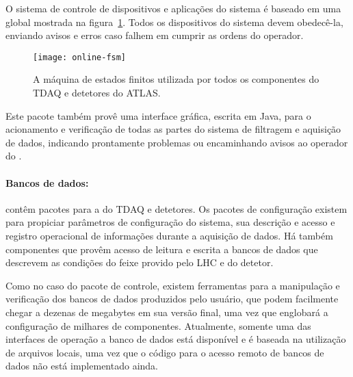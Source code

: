 O sistema de controle de dispositivos e aplicações do sistema  é
baseado em uma  global mostrada na
figura~\ref{fig:online-fsm}. Todos os dispositivos do sistema devem
obedecê-la, enviando avisos e erros caso falhem em cumprir as ordens do
operador.

\begin{figure}
\begin{center}
\texttt{[image: online-fsm]}
\end{center}
\caption{A máquina de estados finitos utilizada por todos os componentes do
TDAQ e detetores do ATLAS.}
\label{fig:online-fsm}
\end{figure}

Este pacote também provê uma interface gráfica, escrita em Java, para o
acionamento e verificação de todas as partes do sistema de filtragem e
aquisição de dados, indicando prontamente problemas ou encaminhando avisos ao
operador do . 



\paragraph{Bancos de dados:} contêm pacotes para a  do TDAQ e
detetores. Os pacotes de configuração existem para propiciar parâmetros de
configuração do sistema, sua descrição e acesso e registro operacional de
informações durante a aquisição de dados. Há também componentes que provêm
acesso de leitura e escrita a bancos de dados que descrevem as condições do
feixe provido pelo LHC e do detetor.

Como no caso do pacote de controle, existem ferramentas para a manipulação e
verificação dos bancos de dados produzidos pelo usuário, que podem facilmente
chegar a dezenas de megabytes em sua versão final, uma vez que englobará a
configuração de milhares de componentes. Atualmente, somente uma das
interfaces de operação a banco de dados está disponível e é baseada na
utilização de arquivos locais, uma vez que o código para o acesso remoto de
bancos de dados não está implementado ainda.

